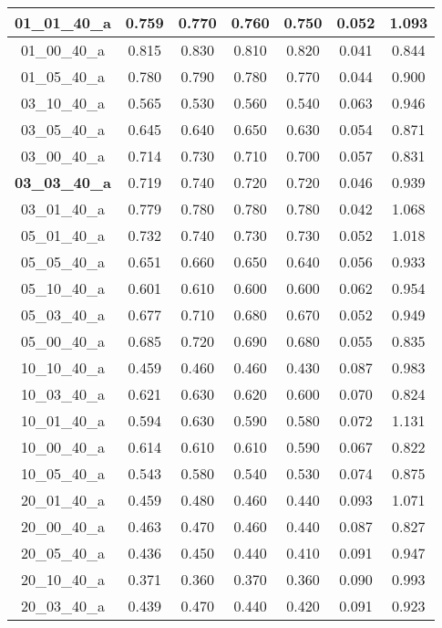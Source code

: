 \begin{table}[H]
{\begin{tabular}{|c|c|c|c|c|c|c|}
01\_01\_40\_a 	& 0.759 	& 0.770 	& 0.760 	& 0.750 	& 0.052 	& 1.093 	 \\ \hline
01\_00\_40\_a 	& 0.815 	& 0.830 	& 0.810 	& 0.820 	& 0.041 	& 0.844 	 \\ \hline
01\_05\_40\_a 	& 0.780 	& 0.790 	& 0.780 	& 0.770 	& 0.044 	& 0.900 	 \\ \hline
03\_10\_40\_a 	& 0.565 	& 0.530 	& 0.560 	& 0.540 	& 0.063 	& 0.946 	 \\ \hline
03\_05\_40\_a 	& 0.645 	& 0.640 	& 0.650 	& 0.630 	& 0.054 	& 0.871 	 \\ \hline
03\_00\_40\_a 	& 0.714 	& 0.730 	& 0.710 	& 0.700 	& 0.057 	& 0.831 	 \\ \hline
\textbf{03\_03\_40\_a} 	& 0.719 	& 0.740 	& 0.720 	& 0.720 	& 0.046 	& 0.939 	 \\ \hline
03\_01\_40\_a 	& 0.779 	& 0.780 	& 0.780 	& 0.780 	& 0.042 	& 1.068 	 \\ \hline
05\_01\_40\_a	& 0.732 	& 0.740 	& 0.730 	& 0.730 	& 0.052 	& 1.018 	 \\ \hline
05\_05\_40\_a 	& 0.651 	& 0.660 	& 0.650 	& 0.640 	& 0.056 	& 0.933 	 \\ \hline
05\_10\_40\_a 	& 0.601 	& 0.610 	& 0.600 	& 0.600		& 0.062 	& 0.954 	 \\ \hline
05\_03\_40\_a 	& 0.677 	& 0.710 	& 0.680 	& 0.670 	& 0.052 	& 0.949 	 \\ \hline
05\_00\_40\_a 	& 0.685 	& 0.720 	& 0.690 	& 0.680 	& 0.055 	& 0.835 	 \\ \hline
10\_10\_40\_a 	& 0.459 	& 0.460 	& 0.460 	& 0.430 	& 0.087 	& 0.983 	 \\ \hline
10\_03\_40\_a	& 0.621 	& 0.630 	& 0.620 	& 0.600 	& 0.070 	& 0.824 	 \\ \hline
10\_01\_40\_a 	& 0.594 	& 0.630 	& 0.590 	& 0.580 	& 0.072 	& 1.131 	 \\ \hline
10\_00\_40\_a 	& 0.614 	& 0.610 	& 0.610 	& 0.590 	& 0.067 	& 0.822 	 \\ \hline
10\_05\_40\_a 	& 0.543 	& 0.580 	& 0.540 	& 0.530 	& 0.074 	& 0.875 	 \\ \hline
20\_01\_40\_a 	& 0.459 	& 0.480 	& 0.460 	& 0.440 	& 0.093 	& 1.071 	 \\ \hline
20\_00\_40\_a 	& 0.463 	& 0.470 	& 0.460 	& 0.440 	& 0.087 	& 0.827 	 \\ \hline
20\_05\_40\_a 	& 0.436 	& 0.450 	& 0.440 	& 0.410 	& 0.091 	& 0.947 	 \\ \hline
20\_10\_40\_a 	& 0.371 	& 0.360 	& 0.370 	& 0.360 	& 0.090 	& 0.993 	 \\ \hline
20\_03\_40\_a	& 0.439 	& 0.470 	& 0.440 	& 0.420 	& 0.091 	& 0.923 	 \\ \hline
\end{tabular}
}
\end{table}

